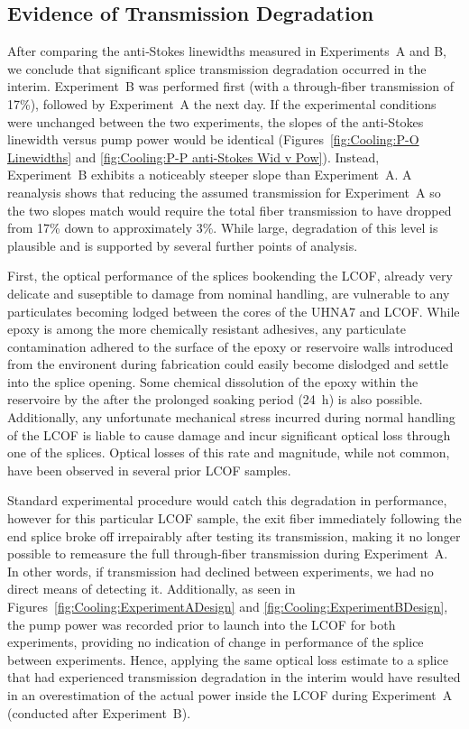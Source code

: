 \subsection{Evidence of Transmission Degradation}
\label{Cooling:subsec:Evidence of Transmission Degradation}

After comparing the anti‐Stokes linewidths measured in Experiments~A and B, we conclude that significant splice transmission degradation occurred in the interim. Experiment~B was performed first (with a through‐fiber transmission of 17\%), followed by Experiment~A the next day. If the experimental conditions were unchanged between the two experiments, the slopes of the anti‐Stokes linewidth versus pump power would be identical (Figures~\ref{fig:Cooling:P-O Linewidths} and \ref{fig:Cooling:P-P anti-Stokes Wid v Pow}). Instead, Experiment~B exhibits a noticeably steeper slope than Experiment~A. A reanalysis shows that reducing the assumed transmission for Experiment~A so the two slopes match would require the total fiber transmission to have dropped from 17\% down to approximately 3\%. While large, degradation of this level is plausible and is supported by several further points of analysis.

First, the optical performance of the splices bookending the \ac{LCOF}, already very delicate and suseptible to damage from nominal handling, are vulnerable to any particulates becoming lodged between the cores of the \ac{UHNA7} and \ac{LCOF}. While epoxy is among the more chemically resistant adhesives, any particulate contamination adhered to the surface of the epoxy or reservoire walls introduced from the environent during fabrication could easily become dislodged and settle into the splice opening. Some chemical dissolution of the epoxy within the reservoire by the  after the prolonged soaking period (\SI{24}{\hour}) is also possible. Additionally, any unfortunate mechanical stress incurred during normal handling of the \ac{LCOF} is liable to cause damage and incur significant optical loss through one of the splices. Optical losses of this rate and magnitude, while not common, have been observed in several prior \ac{LCOF} samples.

Standard experimental procedure would catch this degradation in performance, however for this particular \ac{LCOF} sample, the exit fiber immediately following the end splice broke off irrepairably after testing its transmission, making it no longer possible to remeasure the full through‐fiber transmission during Experiment~A. In other words, if transmission had declined between experiments, we had no direct means of detecting it. Additionally, as seen in Figures~\ref{fig:Cooling:ExperimentADesign} and \ref{fig:Cooling:ExperimentBDesign}, the pump power was recorded prior to launch into the \ac{LCOF} for both experiments, providing no indication of change in performance of the splice between experiments. Hence, applying the same optical loss estimate to a splice that had experienced transmission degradation in the interim would have resulted in an overestimation of the actual power inside the \ac{LCOF} during Experiment~A (conducted after Experiment~B).

